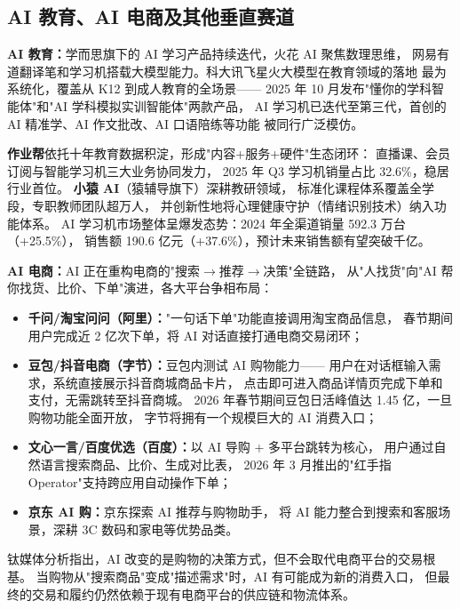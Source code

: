\subsection{AI 教育、AI 电商及其他垂直赛道}
\label{subsec:china-ai-verticals}

\textbf{AI 教育：}学而思旗下的 AI 学习产品持续迭代，火花 AI 聚焦数理思维，
网易有道翻译笔和学习机搭载大模型能力。科大讯飞星火大模型在教育领域的落地
最为系统化，覆盖从 K12 到成人教育的全场景——
2025 年 10 月发布"懂你的学科智能体"和"AI 学科模拟实训智能体"两款产品，
AI 学习机已迭代至第三代，首创的 AI 精准学、AI 作文批改、AI 口语陪练等功能
被同行广泛模仿。

\textbf{作业帮}依托十年教育数据积淀，形成"内容+服务+硬件"生态闭环：
直播课、会员订阅与智能学习机三大业务协同发力，
2025 年 Q3 学习机销量占比 32.6\%，稳居行业首位。
\textbf{小猿 AI}（猿辅导旗下）深耕教研领域，
标准化课程体系覆盖全学段，专职教师团队超万人，
并创新性地将心理健康守护（情绪识别技术）纳入功能体系。
AI 学习机市场整体呈爆发态势：2024 年全渠道销量 592.3 万台（+25.5\%），
销售额 190.6 亿元（+37.6\%），预计未来销售额有望突破千亿。

\textbf{AI 电商：}AI 正在重构电商的"搜索$\to$推荐$\to$决策"全链路，
从"人找货"向"AI 帮你找货、比价、下单"演进，各大平台争相布局：

\begin{itemize}
  \item \textbf{千问/淘宝问问（阿里）：}"一句话下单"功能直接调用淘宝商品信息，
    春节期间用户完成近 2 亿次下单，将 AI 对话直接打通电商交易闭环；
  \item \textbf{豆包/抖音电商（字节）：}豆包内测试 AI 购物能力——
    用户在对话框输入需求，系统直接展示抖音商城商品卡片，
    点击即可进入商品详情页完成下单和支付，无需跳转至抖音商城。
    2026 年春节期间豆包日活峰值达 1.45 亿，一旦购物功能全面开放，
    字节将拥有一个规模巨大的 AI 消费入口；
  \item \textbf{文心一言/百度优选（百度）：}以 AI 导购 + 多平台跳转为核心，
    用户通过自然语言搜索商品、比价、生成对比表，
    2026 年 3 月推出的"红手指 Operator"支持跨应用自动操作下单；
  \item \textbf{京东 AI 购：}京东探索 AI 推荐与购物助手，
    将 AI 能力整合到搜索和客服场景，深耕 3C 数码和家电等优势品类。
\end{itemize}

钛媒体分析指出，AI 改变的是购物的决策方式，但不会取代电商平台的交易根基。
当购物从"搜索商品"变成"描述需求"时，AI 有可能成为新的消费入口，
但最终的交易和履约仍然依赖于现有电商平台的供应链和物流体系。


